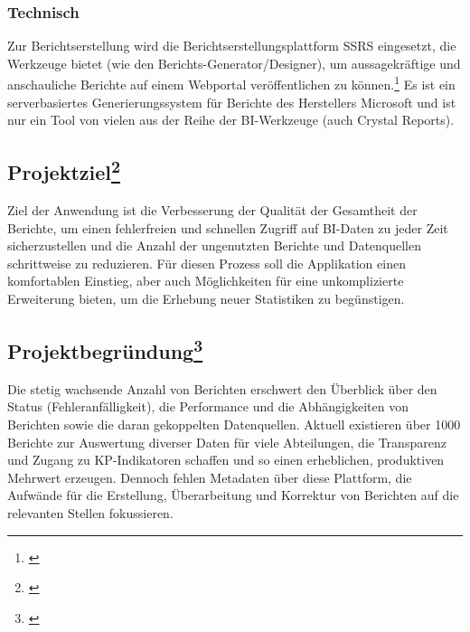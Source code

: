 \subsubsection{Technisch}
\label{sec:Ausgangssituation:Technisch}
Zur Berichtserstellung wird die Berichtserstellungsplattform \ac{SSRS} eingesetzt, die Werkzeuge bietet (wie den Berichts-Generator/Designer), um aussagekräftige und anschauliche Berichte auf einem Webportal veröffentlichen zu können.\footnote{\Vgl \cite{Projektantrag}}
Es ist ein serverbasiertes Generierungssystem für Berichte des Herstellers Microsoft und ist nur ein Tool von vielen aus der Reihe der \ac{BI}-Werkzeuge (\zB auch Crystal Reports).



\subsection[Projektziel]{Projektziel\footnote{\cite{Projektantrag}}}
\label{sec:Projektziel}
\begin{displayquote}
	Ziel der Anwendung ist die Verbesserung der Qualität der Gesamtheit der Berichte, um einen fehlerfreien und schnellen Zugriff auf \ac{BI}-Daten zu jeder Zeit sicherzustellen und die Anzahl der ungenutzten Berichte und Datenquellen schrittweise zu reduzieren. Für diesen Prozess soll die Applikation einen komfortablen Einstieg, aber auch Möglichkeiten für eine unkomplizierte Erweiterung bieten, um \ggfs die Erhebung neuer Statistiken zu begünstigen.
\end{displayquote}


\subsection[Projektbegründung]{Projektbegründung\footnote{\cite{Projektantrag}}}
\label{sec:Projektbegruendung}
\begin{displayquote}
	Die stetig wachsende Anzahl von Berichten erschwert den Überblick über den Status (Fehleranfälligkeit), die Performance und die Abhängigkeiten von Berichten sowie die daran gekoppelten Datenquellen. Aktuell existieren über 1000 Berichte zur Auswertung diverser Daten für viele Abteilungen, die \ua Transparenz und Zugang zu \ac{KP}-Indikatoren schaffen und so einen erheblichen, produktiven Mehrwert erzeugen. Dennoch fehlen Metadaten über diese Plattform, die Aufwände für die Erstellung, Überarbeitung und Korrektur von Berichten auf die relevanten Stellen fokussieren.
\end{displayquote}

